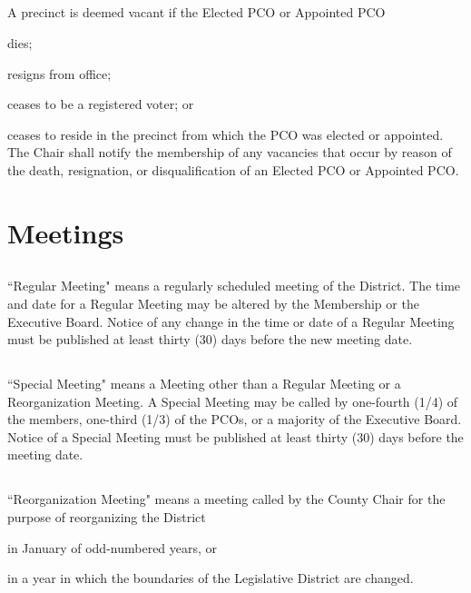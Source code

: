 \subsection{}
A precinct is deemed vacant if the Elected PCO or Appointed PCO
\begin{inlinealphalist}
    \item dies;
    \item resigns from office;
    \item ceases to be a registered voter; or
    \item ceases to reside in the precinct from which the PCO was elected or appointed. The Chair shall notify the membership of any vacancies that occur by reason of the death, resignation, or disqualification of an Elected PCO or Appointed PCO.
\end{inlinealphalist}

\section{Meetings}
\subsection{} \label{regular-meeting}
``Regular Meeting" means a regularly scheduled meeting of the \fortythird{} District. The time and date for a Regular Meeting may be altered by the Membership or the Executive Board. Notice of any change in the time or date of a Regular Meeting must be published at least thirty (30) days before the new meeting date.

\subsection{} \label{special-meeting}
``Special Meeting" means a Meeting other than a Regular Meeting or a Reorganization Meeting. A Special Meeting may be called by one-fourth (1/4) of the members, one-third (1/3) of the PCOs, or a majority of the Executive Board. Notice of a Special Meeting must be published at least thirty (30) days before the meeting date.

\subsection{} \label{reorg-meeting}
``Reorganization Meeting" means a meeting called by the County Chair for the purpose of reorganizing the \fortythird{} District
\begin{inlinealphalist}
    \item in January of odd-numbered years, or
    \item in a year in which the boundaries of the Legislative District are changed.
\end{inlinealphalist}

